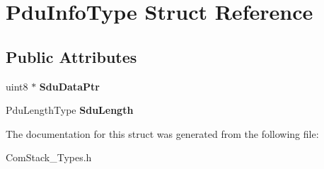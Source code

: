 \hypertarget{structPduInfoType}{}\section{Pdu\+Info\+Type Struct Reference}
\label{structPduInfoType}
\subsection*{Public Attributes}
\begin{DoxyCompactItemize}
\item 
uint8 $\ast$ {\bfseries Sdu\+Data\+Ptr}\hypertarget{structPduInfoType_a73a795f8ebc456b9143b485bab1fdac5}{}\label{structPduInfoType_a73a795f8ebc456b9143b485bab1fdac5}

\item 
Pdu\+Length\+Type {\bfseries Sdu\+Length}\hypertarget{structPduInfoType_abd16c802426db5c3288344e956debb65}{}\label{structPduInfoType_abd16c802426db5c3288344e956debb65}

\end{DoxyCompactItemize}


The documentation for this struct was generated from the following file\+:\begin{DoxyCompactItemize}
\item 
Com\+Stack\+\_\+\+Types.\+h\end{DoxyCompactItemize}
